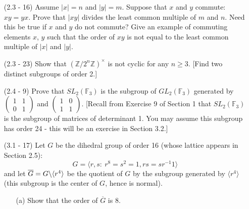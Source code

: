 \documentclass[12pt]{article}
\begin{document}
\begin{enumerate}
\item[(2.3 - 16)] Assume $|x| = n$ and $|y| = m$. Suppose
    that $x$ and $y$ commute: $xy = yx$. Prove that
    $|xy|$ divides the
    least common multiple of $m$ and $n$. Need this be true
    if $x$ and $y$ do not commute? Give an example of commuting
    elements $x$, $y$ such that the order of $xy$ is not
    equal to the least common multiple of $|x|$ and $|y|$.

\begin{mybox}

\end{mybox}

    
\item[(2.3 - 23)] Show that $(\mathbb{Z}/2^n\mathbb{Z})^
{\times}$
    is not cyclic for any $n\geq 3$.
    [Find two distinct subgroups of order 2.]
  
\begin{mybox}
  
\end{mybox}


\item[(2.4 - 9)] Prove that $SL_2(\mathbb{F}_3)$ is the
subgroup of
$GL_2(\mathbb{F}_3)$ generated by $\left(\begin{array}{cc}
    1 & 1\\
    0 & 1
\end{array}\right)$ and $\left(\begin{array}{cc}
    1 & 0\\
    1 & 1
\end{array}\right)$. [Recall from Exercise 9 of Section 1
that $SL_2(\mathbb{F}_3)$ is the subgroup of matrices of
determinant 1. You may assume this subgroup has order 24
- this will be an exercise in Section 3.2.]

\begin{mybox}
  
\end{mybox}
  

\item[(3.1 - 17)] Let $G$ be the dihedral group of order 16
    (whose lattice appears in Section 2.5):
    $$G=\langle r,s :\ r^8=s^2= 1, rs=sr^{-1}1\rangle$$
    and let $\overline{G} = G\char`\\\langle r^4\rangle$ be
    the quotient
    of $G$ by the subgroup generated by $\langle r^4\rangle$
    (this subgroup is the center of $G$, hence is normal).
\begin{enumerate}
    
\item[(a)] Show that the order of $\overline{G}$ is 8.
\begin{mybox}
    

\end{mybox}
\end{enumerate}
\end{enumerate}
\end{document}

